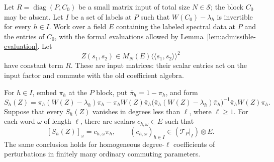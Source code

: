 \begin{proposition}
\label{prop:word-transfer}
Let $R=\operatorname{diag}(P,C_0)$ be a small matrix input of total size $N\in
\mathcal S$;
the block $C_0$ may be absent.  Let $I$ be a set of labels at
$P$ such that $W(C_0)-\lambda_h$ is invertible for every $h\in I$.
Work over a field $E$ containing the labeled spectral data at $P$ and the
entries of $C_0$, with the formal evaluations allowed by
Lemma~\ref{lem:admissible-evaluation}.  Let
\[
 Z(s_1,s_2)\in M_N(E)\langle\!\langle s_1,s_2\rangle\!\rangle^2
\]
have constant term $R$.  These are input matrices: their scalar entries
act on the input factor and commute with the old coefficient algebra.

For $h\in I$, embed $\pi_h$ at the $P$ block, put $\bar\pi_h=1-\pi_h$,
and form
\[
 S_h(Z)=\pi_h(W(Z)-\lambda_h)\pi_h
 -\pi_hW(Z)\bar\pi_h
 \bigl(\bar\pi_h(W(Z)-\lambda_h)\bar\pi_h\bigr)^{-1}
 \bar\pi_hW(Z)\pi_h.
\]
Suppose that every $S_h(Z)$ vanishes in degrees less than $\ell$, where
$\ell\ge1$.  For each word $\omega$ of length $\ell$, there are scalars
$c_{h,\omega}\in E$ such that
\[
 [S_h(Z)]_\omega=c_{h,\omega}\pi_h,
 \qquad (c_{h,\omega})_{h\in I}\in
        (\mathcal T_P|_I)\otimes E.
\]
The same conclusion holds for homogeneous degree-$\ell$ coefficients of
perturbations in finitely many ordinary commuting parameters.
\end{proposition}

